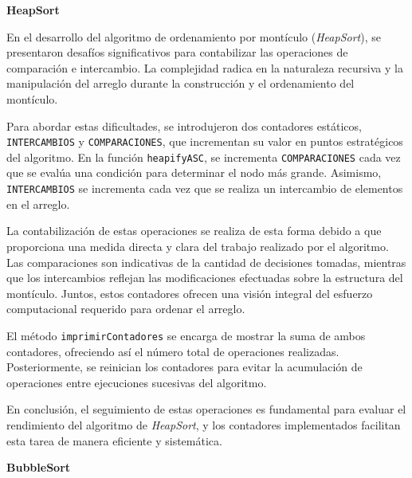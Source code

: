 \documentclass[12pt]{article}
\begin{document}
\par\vspace{0.6cm}
\textcolor[rgb]{0.13, 0.55, 0.13}{\textbf{HeapSort}}
\par\vspace{0.4cm}
En el desarrollo del algoritmo de ordenamiento por montículo (\textit{HeapSort}), se presentaron desafíos significativos para contabilizar las operaciones de comparación e intercambio. La complejidad radica en la naturaleza recursiva y la manipulación del arreglo durante la construcción y el ordenamiento del montículo.
\par\vspace{0.4cm}
Para abordar estas dificultades, se introdujeron dos contadores estáticos, \texttt{INTERCAMBIOS} y \texttt{COMPARACIONES}, que incrementan su valor en puntos estratégicos del algoritmo. En la función \texttt{heapifyASC}, se incrementa \texttt{COMPARACIONES} cada vez que se evalúa una condición para determinar el nodo más grande. Asimismo, \texttt{INTERCAMBIOS} se incrementa cada vez que se realiza un intercambio de elementos en el arreglo.
\par\vspace{0.4cm}
La contabilización de estas operaciones se realiza de esta forma debido a que proporciona una medida directa y clara del trabajo realizado por el algoritmo. Las comparaciones son indicativas de la cantidad de decisiones tomadas, mientras que los intercambios reflejan las modificaciones efectuadas sobre la estructura del montículo. Juntos, estos contadores ofrecen una visión integral del esfuerzo computacional requerido para ordenar el arreglo.
\par\vspace{0.4cm}
El método \texttt{imprimirContadores} se encarga de mostrar la suma de ambos contadores, ofreciendo así el número total de operaciones realizadas. Posteriormente, se reinician los contadores para evitar la acumulación de operaciones entre ejecuciones sucesivas del algoritmo.
\par\vspace{0.4cm}
En conclusión, el seguimiento de estas operaciones es fundamental para evaluar el rendimiento del algoritmo de \textit{HeapSort}, y los contadores implementados facilitan esta tarea de manera eficiente y sistemática.
\par\vspace{0.6cm}
\textcolor[rgb]{0.13, 0.55, 0.13}{\textbf{BubbleSort}}
\par\vspace{0.4cm}
\end{document}
